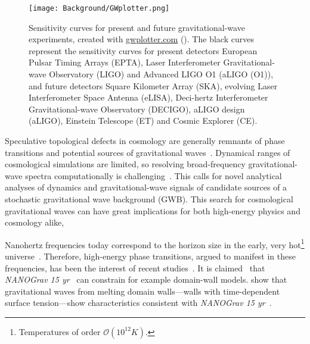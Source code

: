 \begin{figure}[hb]
    \centering
    \texttt{[image: Background/GWplotter.png]}
    \caption{Sensitivity curves for present and future gravitational-wave experiments, created with \href{http://www.sr.bham.ac.uk/~cplb/GWplotter/}{\textsf{gwplotter.com}} (\thismonthyear). The black curves represent the sensitivity curves for present detectors European Pulsar Timing Arrays (EPTA), Laser Interferometer Gravitational-wave Observatory (LIGO) and Advanced LIGO O1 (aLIGO (O1)), and future detectors Square Kilometer Array (SKA), evolving Laser Interferometer Space Antenna (eLISA), Deci-hertz Interferometer Gravitational-wave Observatory (DECIGO), aLIGO design (aLIGO), Einstein Telescope (ET) and Cosmic Explorer (CE).}
    \label{fig:intro:GWplotter}
\end{figure}


Speculative topological defects in cosmology are generally remnants of phase transitions and potential sources of gravitational waves~\citep{christiansenGravitationalWavesDark2024,saikawaReviewGravitationalWaves2017}. Dynamical ranges of cosmological simulations are limited, so resolving broad-frequency gravitational-wave spectra computationally is challenging~\citep{saikawaReviewGravitationalWaves2017}. \hypertarget{sentence1}{This calls for novel analytical analyses of dynamics and gravitational-wave signals} of candidate sources of a stochastic gravitational wave background (GWB). This search for cosmological gravitational waves can have great implications for both high-energy physics and cosmology alike,  

Nanohertz frequencies today correspond to the horizon size in the early, very hot\footnote{Temperatures of order $\mathscr{O}(10^{12}\unit{K})$.} %
universe~\citep{christiansenGravitationalWavesDark2024}. Therefore, high-energy phase transitions, argued to manifest in these frequencies, has been the interest of recent studies~\citep{babichevNANOGravSpectralIndex2023,saikawaReviewGravitationalWaves2017,liProbingHighTemperature2023,hiramatsuGravitationalWavesCollapsing2010}. It is claimed~\citep{afzalNANOGrav15Yr2023} that \textit{NANOGrav 15 yr}~\cite{agazieNANOGrav15Yr2023a} can constrain for example domain-wall models.  show that gravitational waves from melting domain walls---walls with time-dependent surface tension---show characteristics consistent with \textit{NANOGrav 15 yr}~\cite{agazieNANOGrav15Yr2023a}.  



